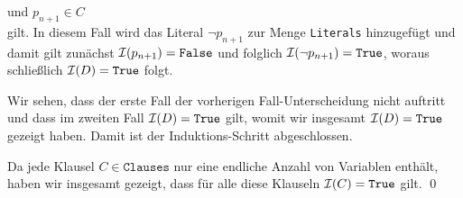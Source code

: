 \begin{enumerate}
\begin{enumerate}
\begin{enumerate}
                         \quad und \quad $p_{n+1} \in C$
                         \\[0.2cm]
                         gilt.  In diesem Fall wird das Literal $\neg p_{n+1}$ zur Menge \texttt{Literals}
                         hinzugefügt und damit gilt zunächst $\mathcal{I}(p_{n+1}) = \texttt{False}$ und folglich
                         $\mathcal{I}(\neg p_{n+1}) = \texttt{True}$, woraus schließlich $\mathcal{I}(D) = \texttt{True}$ folgt.
                   \end{enumerate}
                   Wir sehen, dass der erste Fall der vorherigen Fall-Unterscheidung nicht
                   auftritt und dass im zweiten Fall $\mathcal{I}(D) = \texttt{True}$ gilt, womit wir insgesamt 
                   $\mathcal{I}(D) = \texttt{True}$ gezeigt haben.  Damit ist der Induktions-Schritt
                   abgeschlossen.
             \end{enumerate}
             Da jede Klausel $C \in \texttt{Clauses}$ nur eine endliche Anzahl von Variablen
             enthält, haben wir insgesamt gezeigt, dass für alle diese Klauseln 
             $\mathcal{I}(C) = \texttt{True}$ gilt. \qed
\end{enumerate}

